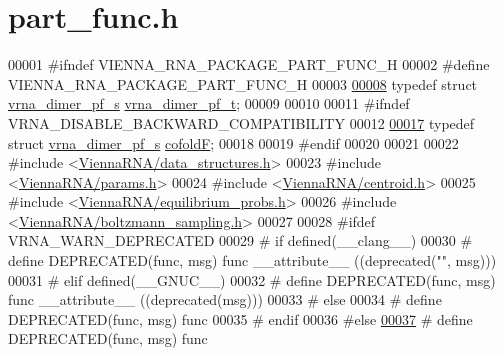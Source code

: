 \hypertarget{part__func_8h_source}{}\section{part\+\_\+func.\+h}
\label{part__func_8h_source}

\begin{DoxyCode}
00001 \textcolor{preprocessor}{#ifndef VIENNA\_RNA\_PACKAGE\_PART\_FUNC\_H}
00002 \textcolor{preprocessor}{#define VIENNA\_RNA\_PACKAGE\_PART\_FUNC\_H}
00003 
\mbox{\hyperlink{group__pf__cofold_ga444df1587c9a2ca15b8eb25188f629c3}{00008}} \textcolor{keyword}{typedef} \textcolor{keyword}{struct }\mbox{\hyperlink{group__pf__cofold_structvrna__dimer__pf__s}{vrna\_dimer\_pf\_s}} \mbox{\hyperlink{group__pf__cofold_structvrna__dimer__pf__s}{vrna\_dimer\_pf\_t}};
00009 
00010 
00011 \textcolor{preprocessor}{#ifndef VRNA\_DISABLE\_BACKWARD\_COMPATIBILITY}
00012 
\mbox{\hyperlink{group__pf__cofold_ga5445d8d96a40e9e79b1fa5a7f1a6b7ea}{00017}} \textcolor{keyword}{typedef} \textcolor{keyword}{struct }\mbox{\hyperlink{group__pf__cofold_structvrna__dimer__pf__s}{vrna\_dimer\_pf\_s}} \mbox{\hyperlink{group__pf__cofold_structvrna__dimer__pf__s}{cofoldF}};
00018 
00019 \textcolor{preprocessor}{#endif}
00020 
00021 
00022 \textcolor{preprocessor}{#include <\mbox{\hyperlink{data__structures_8h}{ViennaRNA/data\_structures.h}}>}
00023 \textcolor{preprocessor}{#include <\mbox{\hyperlink{params_8h}{ViennaRNA/params.h}}>}
00024 \textcolor{preprocessor}{#include <\mbox{\hyperlink{centroid_8h}{ViennaRNA/centroid.h}}>}
00025 \textcolor{preprocessor}{#include <\mbox{\hyperlink{equilibrium__probs_8h}{ViennaRNA/equilibrium\_probs.h}}>}
00026 \textcolor{preprocessor}{#include <\mbox{\hyperlink{boltzmann__sampling_8h}{ViennaRNA/boltzmann\_sampling.h}}>}
00027 
00028 \textcolor{preprocessor}{#ifdef VRNA\_WARN\_DEPRECATED}
00029 \textcolor{preprocessor}{# if defined(\_\_clang\_\_)}
00030 \textcolor{preprocessor}{#  define DEPRECATED(func, msg) func \_\_attribute\_\_ ((deprecated("", msg)))}
00031 \textcolor{preprocessor}{# elif defined(\_\_GNUC\_\_)}
00032 \textcolor{preprocessor}{#  define DEPRECATED(func, msg) func \_\_attribute\_\_ ((deprecated(msg)))}
00033 \textcolor{preprocessor}{# else}
00034 \textcolor{preprocessor}{#  define DEPRECATED(func, msg) func}
00035 \textcolor{preprocessor}{# endif}
00036 \textcolor{preprocessor}{#else}
\mbox{\hyperlink{part__func_8h_aab347a3c03fbe8e7319551b9fa0cce4a}{00037}} \textcolor{preprocessor}{# define DEPRECATED(func, msg) func}

\end{DoxyCode}
